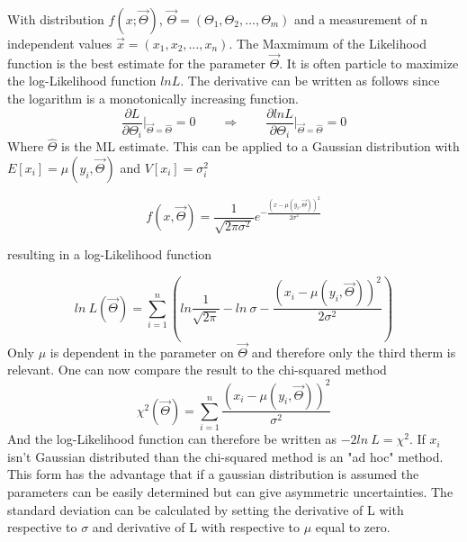 \documentclass[../Bachelorarbeit.tex]{subfiles}
\begin{document}
With distribution $f(x;\overrightarrow{\Theta})$, $\overrightarrow{\Theta} = (\Theta_{1},\Theta_{2},\dots,\Theta_{m})$ and a measurement of n independent values $\overrightarrow{x}=(x_{1},x_{2},\dots,x_{n})$.
The Maxmimum of the Likelihood function is the best estimate for the parameter $\overrightarrow{\Theta}$.
It is often particle to maximize the log-Likelihood function $ln L$. The derivative can be written as follows since the logarithm is a monotonically increasing function.
\begin{equation}
    \frac{\partial L}{\partial \Theta_{i}} \bigg \vert_{\overrightarrow{\Theta}=\hat{\Theta}} = 0 \qquad \Longrightarrow \qquad \frac{\partial ln L}{\partial \Theta_{i}} \bigg \vert_{\overrightarrow{\Theta}=\hat{\Theta}}=0
\end{equation}
Where $\hat{\Theta}$ is the ML estimate. This can be applied to a Gaussian distribution with $E[x_{i}]=\mu(y_{i},\overrightarrow{\Theta})$ and $V[x_{i}]=\sigma_{i}^{2}$

\begin{equation}
    f(x,\overrightarrow{\Theta}) = \frac{1}{\sqrt{2\pi \sigma^{2}}} e^{-\frac{(x-\mu(y_{i},\overrightarrow{\Theta}))^{2}}{2 \sigma^{2}}}
\end{equation}

resulting in a log-Likelihood function

\begin{equation}
    ln \: L(\overrightarrow{\Theta}) = \sum^{n}_{i=1} \left( ln \frac{1}{\sqrt{2\pi}}-ln \: \sigma - \frac{(x_{i} - \mu(y_{i},\overrightarrow{\Theta}))^2}{2 \sigma^{2}}\right)
\end{equation}
Only $\mu$ is dependent in the parameter on $\overrightarrow{\Theta}$ and therefore only the third therm is relevant. One can now compare the result to the chi-squared method
\begin{equation}
    \chi^{2}(\overrightarrow{\Theta}) = \sum^{n}_{i=1} \frac{(x_{i} - \mu(y_{i},\overrightarrow{\Theta}))^2}{\sigma^{2}}
\end{equation}
And the log-Likelihood function can therefore be written as $-2 ln \: L = \chi^{2}$. If $x_{i}$ isn't Gaussian distributed than the chi-squared method is an "ad hoc" method.
This form has the advantage that if a gaussian distribution is assumed the parameters can be easily determined but can give asymmetric uncertainties.
The standard deviation can be calculated by setting the derivative of L with respective to $\sigma$ and derivative of L with respective to $\mu$ equal to zero.
\end{document}
